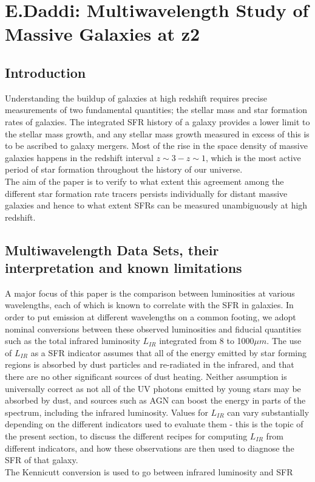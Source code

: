 \documentclass{literature}
\begin{document}

\section{E.Daddi: Multiwavelength Study of Massive Galaxies at z2}
\subsection{Introduction}
Understanding the buildup of galaxies at high redshift requires precise measurements of two fundamental quantities; the stellar mass
and star formation rates of galaxies. The integrated SFR history of a galaxy provides a lower limit to the stellar mass growth, and any stellar mass growth measured in excess of this is to be ascribed to galaxy mergers. Most of the rise in the space density of massive galaxies happens in the redshift interval $z \sim 3 - z\sim 1$, which is the most active period of star formation throughout the history of our universe. \\
The aim of the paper is to verify to what extent this agreement among the different star formation rate tracers persists individually for distant massive galaxies and hence to what extent SFRs can be measured unambiguously at high redshift. 
\subsection{Multiwavelength Data Sets, their interpretation and known limitations}
A major focus of this paper is the comparison between luminosities at various wavelengths, each of which is known to correlate with the SFR in galaxies. In order to put emission at different wavelengths on a common footing, we adopt nominal conversions between these observed luminosities and fiducial quantities such as the total infrared luminosity $L_{IR}$ integrated from 8 to 1000$\mu m$. The use of $L_{IR}$ as a SFR indicator assumes that all of the energy emitted by star forming regions is absorbed by dust particles and re-radiated in the infrared, and that there are no other significant sources of dust heating. Neither assumption is universally correct as not all of the UV photons emitted by young stars may be absorbed by dust, and sources such as AGN can boost the energy in parts of the spectrum, including the infrared luminosity. Values for $L_{IR}$ can vary substantially depending on the different indicators used to evaluate them - this is the topic of the present section, to discuss the different recipes for computing $L_{IR}$ from different indicators, and how these observations are then used to diagnose the SFR of that galaxy. \\ 
The Kennicutt conversion is used to go between infrared luminosity and SFR
\end{document}
